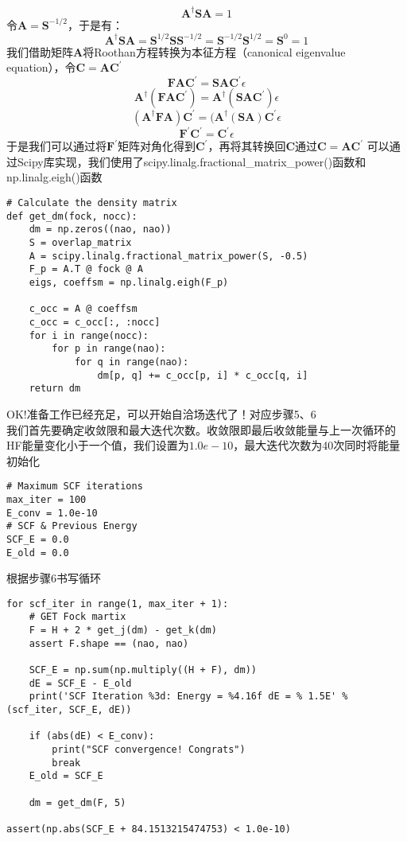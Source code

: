 \documentclass[12pt, a4paper, oneside]{ctexart}
\begin{document}
$$\mathbf{A}^{\dagger}\mathbf{S}\mathbf{A}=1$$
令$\mathbf{A}=\mathbf{S}^{-1/2}$，于是有：
$$\mathbf{A}^{\dagger}\mathbf{S}\mathbf{A}=\mathbf{S}^{1/2}\mathbf{S}\mathbf{S}^{-1/2}=\mathbf{S}^{-1/2}\mathbf{S}^{1/2}=\mathbf{S}^{0}=1$$
我们借助矩阵\textbf{A}将Roothan方程转换为本征方程（canonical eigenvalue equation），令$\mathbf{C}=\mathbf{A}\mathbf{C}^{\prime}$
$$\mathbf{F}\mathbf{A}\mathbf{C}^{\prime}=\mathbf{S}\mathbf{A}\mathbf{C}^{\prime}\epsilon$$
$$\mathbf{A}^{\dagger}(\mathbf{F}\mathbf{A}\mathbf{C}^{\prime})=\mathbf{A}^{\dagger}(\mathbf{S}\mathbf{A}\mathbf{C}^{\prime})\epsilon$$
$$(\mathbf{A}^{\dagger}\mathbf{F}\mathbf{A})\mathbf{C}^{\prime}=(\mathbf{A}^{\dagger}(\mathbf{S}\mathbf{A})\mathbf{C}^{\prime}\epsilon$$
$$\mathbf{F}^{\prime}\mathbf{C}^{\prime}=\mathbf{C}^{\prime}\epsilon$$
于是我们可以通过将$\mathbf{F}^{\prime}$矩阵对角化得到$\mathbf{C}^{\prime}$，再将其转换回$\mathbf{C}$通过$\mathbf{C}=\mathbf{A}\mathbf{C}^{\prime}$
可以通过Scipy库实现，我们使用了scipy.linalg.fractional\_matrix\_power()函数和np.linalg.eigh()函数
\begin{lstlisting}[style = Python]
# Calculate the density matrix
def get_dm(fock, nocc):
    dm = np.zeros((nao, nao))
    S = overlap_matrix
    A = scipy.linalg.fractional_matrix_power(S, -0.5)
    F_p = A.T @ fock @ A
    eigs, coeffsm = np.linalg.eigh(F_p)

    c_occ = A @ coeffsm
    c_occ = c_occ[:, :nocc]
    for i in range(nocc):
        for p in range(nao):
            for q in range(nao):
                dm[p, q] += c_occ[p, i] * c_occ[q, i]
    return dm
\end{lstlisting}
OK!准备工作已经充足，可以开始自洽场迭代了！对应步骤5、6\\
我们首先要确定收敛限和最大迭代次数。收敛限即最后收敛能量与上一次循环的HF能量变化小于一个值，我们设置为$1.0e-10$，最大迭代次数为40次同时将能量初始化
\begin{lstlisting}[style = Python]
# Maximum SCF iterations
max_iter = 100
E_conv = 1.0e-10
# SCF & Previous Energy
SCF_E = 0.0
E_old = 0.0
\end{lstlisting}
根据步骤6书写循环
\begin{lstlisting}[style = Python]
for scf_iter in range(1, max_iter + 1):
    # GET Fock martix
    F = H + 2 * get_j(dm) - get_k(dm)
    assert F.shape == (nao, nao)

    SCF_E = np.sum(np.multiply((H + F), dm))
    dE = SCF_E - E_old
    print('SCF Iteration %3d: Energy = %4.16f dE = % 1.5E' % (scf_iter, SCF_E, dE))

    if (abs(dE) < E_conv):
        print("SCF convergence! Congrats")
        break
    E_old = SCF_E

    dm = get_dm(F, 5)

assert(np.abs(SCF_E + 84.1513215474753) < 1.0e-10)
\end{lstlisting}
\newpage
\end{document}
